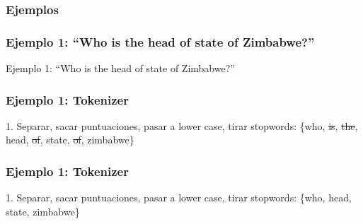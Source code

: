 




\subsubsection*{Ejemplos}

\begin{frame}[t]
\frametitle{Ejemplo 1: ``Who is the head of state of Zimbabwe?''}
Ejemplo 1:\newline
  \Large{``Who is the head of state of Zimbabwe?''}
\end{frame}

\begin{frame}[t]
\frametitle{Ejemplo 1: Tokenizer}
1. Separar, sacar puntuaciones, pasar a lower case, tirar stopwords:\newline
  \Large{\{{\color{blue}w}ho, {\color{red}\st{is}}, {\color{red}\st{the}}, head, {\color{red}\st{of}}, state, {\color{red}\st{of}}, {\color{blue}z}imbabwe\}}
\end{frame}


\begin{frame}[t]
\frametitle{Ejemplo 1: Tokenizer}
1. Separar, sacar puntuaciones, pasar a lower case, tirar stopwords:\newline
  \Large{\{who, head, state, zimbabwe\}}
\end{frame}

